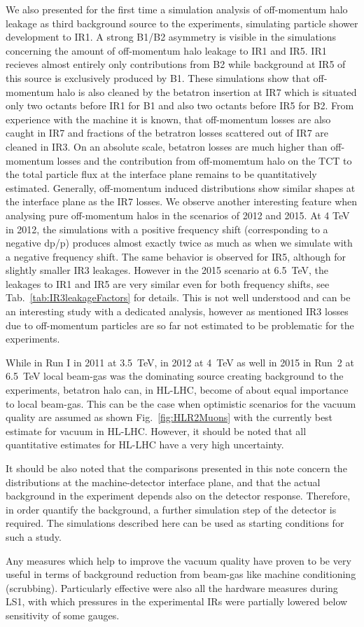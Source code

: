 We also presented for the first time a simulation analysis of off-momentum halo leakage as third background source to the experiments, simulating particle shower development to IR1. A strong B1/B2 asymmetry is visible in the simulations concerning the amount of off-momentum halo leakage to IR1 and IR5. IR1 recieves almost entirely only contributions from B2 while background at IR5 of this source is exclusively produced by B1. These simulations show that off-momentum halo is also cleaned by the betatron insertion at IR7 which is situated only two octants before IR1 for B1 and also two octants before IR5 for B2. From experience with the machine it is known, that off-momentum losses are also caught in IR7 and fractions of the betratron losses scattered out of IR7 are cleaned in IR3. On an absolute scale, betatron losses are much higher than off-momentum losses and the contribution from off-momemtum halo on the TCT to the total particle flux at the interface plane remains to be quantitatively estimated.
Generally, off-momentum induced distributions show similar shapes at the interface plane as the IR7 losses. We observe another interesting feature when analysing pure off-momentum halos in the scenarios of 2012 and 2015. At 4 TeV in 2012, the simulations with a positive frequency shift (corresponding to a negative dp/p) produces almost exactly twice as much as when we simulate with a negative frequency shift. The same behavior is observed for IR5, although for slightly smaller IR3 leakages. However in the 2015 scenario at 6.5~TeV, the leakages to IR1 and IR5 are very similar even for both frequency shifts, see Tab.~\ref{tab:IR3leakageFactors} for details. This is not well understood and can be an interesting study with a dedicated analysis, however as mentioned IR3 losses due to off-momentum particles are so far not estimated to be problematic for the experiments. 


While in Run I in 2011 at 3.5~TeV, in 2012 at 4~TeV as well in 2015 in Run~2 at 6.5~TeV local beam-gas was the dominating source creating background to the experiments, betatron halo can, in HL-LHC, become of about equal importance to local beam-gas. This can be the case when optimistic scenarios for the vacuum quality are assumed as shown Fig.~\ref{fig:HLR2Muons} with the currently best estimate for vacuum in HL-LHC. However, it should be noted that all quantitative estimates for HL-LHC have a very high uncertainty.

It should be also noted that the comparisons presented in this note concern the distributions at the machine-detector interface plane, and that the actual background in the experiment depends also on the detector response. Therefore, in order quantify the background, a further simulation step of the detector is required. The simulations described here can be used as starting conditions for such a study.

Any measures which help to improve the vacuum quality have proven to be very useful in terms of background reduction from beam-gas like machine conditioning (scrubbing). Particularly effective were also all the hardware measures during LS1, with which pressures in the experimental IRs were partially lowered below sensitivity of some gauges.



